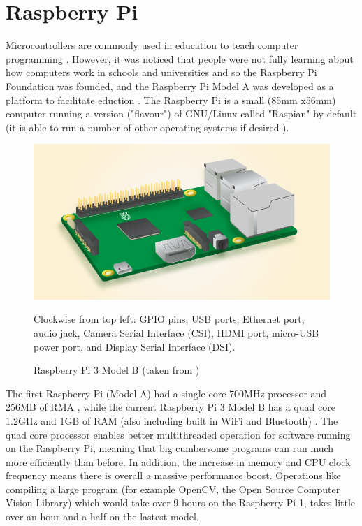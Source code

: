 \documentclass{report}
\begin{document}
	\section{Raspberry Pi}
	\noindent
	Microcontrollers are commonly used in education to teach computer programming \cite{backmcedu1, backmcedu2}. However, it was noticed that people were not fully learning about how computers work in schools and universities and so the Raspberry Pi Foundation was founded, and the Raspberry Pi Model A was developed as a platform to facilitate eduction \cite{pihistory}. The Raspberry Pi is a small (85mm x56mm) \cite{pi3mechdraw} computer running a version ("flavour") of GNU/Linux called "Raspian" by default (it is able to run a number of other operating systems if desired \cite{piotheros}).  \newline
	\begin{figure}[h!]
	\centering
	\includegraphics[scale=0.5]{images/pi3modelb.png}
	\caption{Raspberry Pi 3 Model B (taken from  \cite{pi3info})}
	\label{pidia}
	\footnotesize Clockwise from top left: GPIO pins, USB ports, Ethernet port, audio jack, Camera Serial Interface (CSI), HDMI port, micro-USB power port, and Display Serial Interface (DSI).
	\end{figure} \newline \noindent
	The first Raspberry Pi (Model A) had a single core 700MHz processor and 256MB of RMA \cite{pi1info}, while the current Raspberry Pi 3 Model B has a quad core 1.2GHz and 1GB of RAM (also including built in WiFi and Bluetooth) \cite{pi3info}. The quad core processor enables better multithreaded operation for software running on the Raspberry Pi, meaning that big cumbersome programs can run much more efficiently than before. In addition, the increase in memory and CPU clock frequency means there is overall a massive performance boost. Operations like compiling a large program (for example OpenCV, the Open Source Computer Vision Library) which would take over 9 hours \cite{pipowercompold} on the Raspberry Pi 1, takes little over an hour and a half \cite{pipowercompnew} on the lastest model.\newline \newline  \noindent
\end{document}
